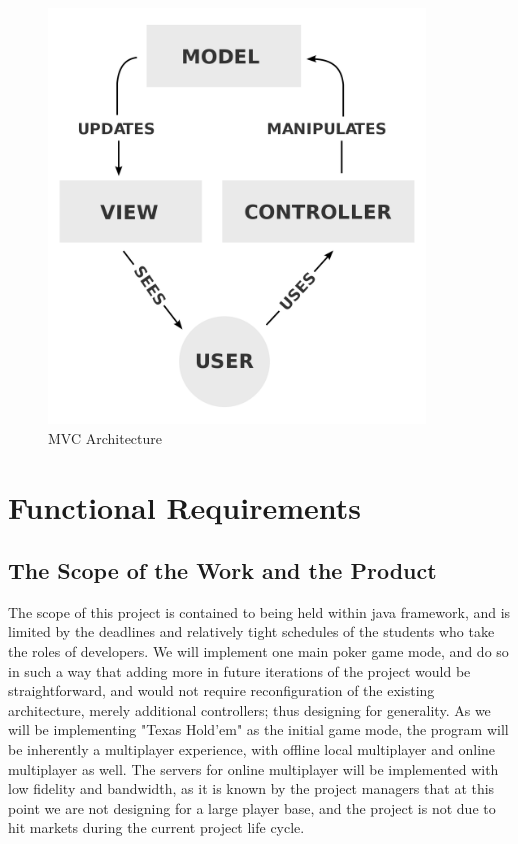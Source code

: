 \documentclass[12pt, titlepage]{article}
\begin{document}
\begin{figure}
    \centering
    \includegraphics[width=10cm]{MVC-Process.svg.png}
    \caption{MVC Architecture}
\end{figure}

\section{Functional Requirements}

\subsection{The Scope of the Work and the Product}

    The scope of this project is contained to being held within java framework, and is limited by the deadlines and relatively tight schedules of the students who take the roles of developers. We will implement one main poker game mode, and do so in such a way that adding more in future iterations of the project would be straightforward, and would not require reconfiguration of the existing architecture, merely additional controllers; thus designing for generality. As we will be implementing "Texas Hold'em" as the initial game mode, the program will be inherently a multiplayer experience, with offline local multiplayer and online multiplayer as well. The servers for online multiplayer will be implemented with low fidelity and bandwidth, as it is known by the project managers that at this point we are not designing for a large player base, and the project is not due to hit markets during the current project life cycle.
    
\end{document}
